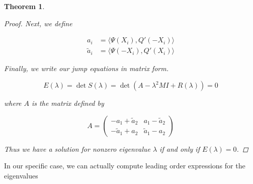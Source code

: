 \documentclass[12pt]{article}
\newtheorem{theorem}{Theorem}
\begin{document}
\begin{theorem}
\begin{proof}
Next, we define

\begin{align*}
a_i &= \langle \Psi (X_i), Q'(-X_i) \rangle \\
\tilde{a}_i &= \langle \Psi(-X_i), Q'(X_i) \rangle
\end{align*}

Finally, we write our jump equations in matrix form.

\[
E(\lambda) = \det S(\lambda) = \det(A - \lambda^2 MI + R(\lambda) ) = 0
\]

where $A$ is the matrix defined by

\[
A = 
\begin{pmatrix}
-a_1 + \tilde{a}_2 & a_1 - \tilde{a}_2 \\
-\tilde{a}_1 + a_2 & \tilde{a}_1 - a_2 
\end{pmatrix}
\]

Thus we have a solution for nonzero eigenvalue $\lambda$ if and only if $E(\lambda) = 0$.

\end{proof}
\end{theorem}

In our specific case, we can actually compute leading order expressions for the eigenvalues
\end{document}
